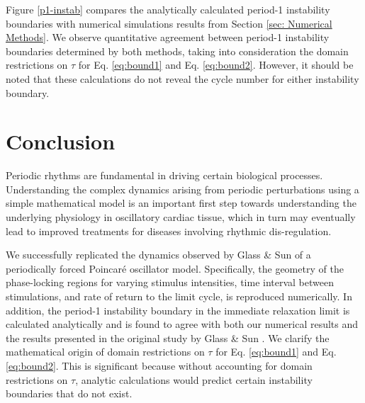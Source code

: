 Figure \ref{p1-instab} compares the analytically calculated period-1 instability boundaries with numerical simulations results from Section \ref{sec: Numerical Methods}. We observe quantitative agreement between period-1 instability boundaries determined by both methods, taking into consideration the domain restrictions on $\tau$ for Eq. \ref{eq:bound1} and Eq. \ref{eq:bound2}. However, it should be noted that these calculations do not reveal the cycle number for either instability boundary.

\section{Conclusion}

Periodic rhythms are fundamental in driving certain biological processes. Understanding the complex dynamics arising from periodic perturbations using a simple mathematical model is an important first step towards understanding the underlying physiology in oscillatory cardiac tissue, which in turn may eventually lead to improved treatments for diseases involving rhythmic dis-regulation.

We successfully replicated the dynamics observed by Glass \& Sun \supercite{GLASS1994} of a periodically forced Poincaré oscillator model. Specifically, the geometry of the phase-locking regions for varying stimulus intensities, time interval between stimulations, and rate of return to the limit cycle, is reproduced numerically. In addition, the period-1 instability boundary in the immediate relaxation limit is calculated analytically and is found to agree with both our numerical results and the results presented in the original study by Glass \& Sun \supercite{GLASS1994}. We clarify the mathematical origin of domain restrictions on $\tau$ for Eq. \ref{eq:bound1} and Eq. \ref{eq:bound2}. This is significant because without accounting for domain restrictions on $\tau$, analytic calculations would predict certain instability boundaries that do not exist.
